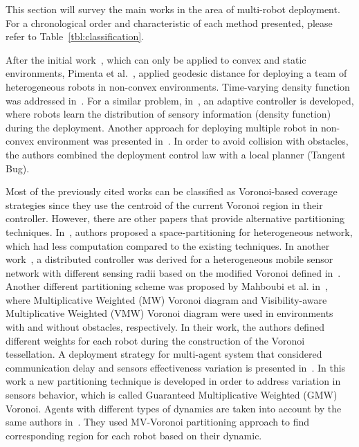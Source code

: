 \documentclass[twocolumn]{svjour3}       %
\begin{document}
This section will survey the main works in the area of multi-robot deployment. For a chronological order and characteristic of each method presented, please refer to Table~\ref{tbl:classification}. 

After the initial  work~\cite{Cortes2004}, which can only be applied to convex and static environments, Pimenta et al.~\cite{Pimenta2008}, applied geodesic distance for deploying a team of heterogeneous robots in non-convex environments. Time-varying density function was addressed in~\cite{Pimenta2088SCAT}. For a similar problem, in~\cite{Schwager2009}, an adaptive controller is developed, where robots learn the distribution of sensory information (density function) during the deployment.
Another approach for deploying multiple robot in non-convex environment was presented in~\cite{Breitenmoser2010}. In order to avoid collision with obstacles, the authors combined the deployment control law with a local planner (Tangent Bug).

Most of the previously cited works can be classified as Voronoi-based coverage strategies since they use the centroid of the current Voronoi region in their controller. However, there are other papers that provide alternative partitioning techniques. In~\cite{Tzes2010}, authors proposed a space-partitioning for heterogeneous network, which had less computation compared to the existing techniques. In another work~\cite{Stergi2011}, a distributed controller was derived for a heterogeneous mobile sensor network with different sensing radii based on the modified Voronoi defined in~\cite{Tzes2010}.
%
Another different partitioning scheme was proposed by Mahboubi et al. in~\cite{Mahboubi2012}, where Multiplicative Weighted (MW) Voronoi  diagram and Visibility-aware Multiplicative Weighted (VMW) Voronoi diagram were used in environments with and without obstacles, respectively. In their work, the authors defined different weights for each robot during the construction of the Voronoi tessellation.
%
A deployment strategy for multi-agent system that considered communication delay and sensors effectiveness variation is presented in~\cite{Sharifi2014}. In this work a new partitioning technique is developed in order to address variation in sensors behavior, which is called Guaranteed Multiplicative Weighted (GMW) Voronoi.
%
Agents with different types of dynamics are taken into account by the same authors in~\cite{Sharifi2015}. They used MV-Voronoi partitioning approach to find corresponding region for each robot based on their dynamic.
\end{document}

